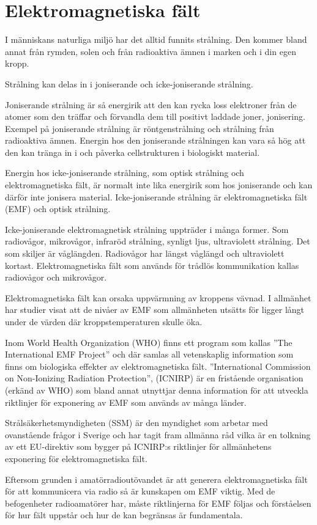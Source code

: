 \chapter{Elektromagnetiska fält}
\label{ch:emf}

I människans naturliga miljö har det alltid funnits strålning.
Den kommer bland annat från rymden, solen och från radioaktiva ämnen i marken
och i din egen kropp.

Strålning kan delas in i joniserande och icke-joniserande strålning.

Joniserande strålning är så energirik att den kan rycka loss elektroner från de
atomer som den träffar och förvandla dem till positivt laddade joner,
jonisering.
Exempel på joniserande strålning är röntgenstrålning och strålning från
radioaktiva ämnen.
Energin hos den joniserande strålningen kan vara så hög att den kan tränga in i
och påverka cellstrukturen i biologiskt material.

Energin hos icke-joniserande strålning, som optisk strålning och
elektromagnetiska fält, är normalt inte lika energirik som hos joniserande och
kan därför inte jonisera material. Icke-joniserande strålning är
elektromagnetiska fält (EMF) och optisk strålning.

Icke-joniserande elektromagnetisk strålning uppträder i många former.
Som radiovågor, mikrovågor, infraröd strålning, synligt ljus, ultraviolett
strålning.
Det som skiljer är våglängden.
Radiovågor har längst våglängd och ultraviolett kortast.
Elektromagnetiska fält som används för trådlös kommunikation kallas radiovågor
och mikrovågor.

Elektromagnetiska fält kan orsaka uppvärmning av kroppens vävnad.
I allmänhet har studier visat att de nivåer av EMF som allmänheten utsätts för
ligger långt under de värden där kroppstemperaturen skulle öka.

Inom World Health Organization (WHO) finns ett program som kallas ''The
International EMF Project'' och där samlas all
vetenskaplig information som finns
om biologiska effekter av elektromagnetiska fält.
''International Commission on Non-Ionizing Radiation Protection'', (ICNIRP) är
en fristående organisation (erkänd av WHO) som bland annat utnyttjar denna
information för att utveckla riktlinjer för exponering av EMF som används av
många länder.

Strålsäkerhetsmyndigheten (SSM) är den myndighet som arbetar med ovanstående
frågor i Sverige och har tagit fram allmänna råd vilka är en tolkning av ett
EU-direktiv som bygger på ICNIRP:s riktlinjer för allmänhetens exponering för
elektromagnetiska fält.

Eftersom grunden i amatörradioutövandet är att generera elektromagnetiska fält
för att kommunicera via radio så är kunskapen om EMF viktig.
Med de befogenheter radioamatörer har, måste riktlinjerna för EMF följas och
förståelsen för hur fält uppstår och hur de kan begränsas är fundamentala.
